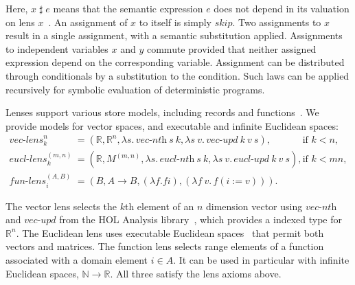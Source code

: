 \documentclass[envcountsame,envcountsect]{llncs}
\newcommand{\sskip}{\mathit{skip}}
\newcommand{\Pow}{\mathcal{P}}
\newcommand{\reals}{\mathbb{R}}
\newcommand{\unrest}{\mathop{\sharp}}
\begin{document}
Here, $x \unrest e$ means that the semantic expression $e$
does not depend in its valuation on lens
$x$~\cite{FosterZW16}. An assignment of $x$ to itself is
simply $\sskip$. Two assignments to $x$ result in a single
assignment, with a semantic substitution
applied. Assignments to independent variables $x$ and $y$
commute provided that neither assigned expression depend on
the corresponding variable.  Assignment can be distributed
through conditionals by a substitution to the
condition. Such laws can be applied recursively for symbolic
evaluation of deterministic programs.


Lenses support various store models, including records and
functions~\cite{FosterZW16}. We provide models for
vector spaces, and executable and infinite Euclidean spaces:
%
\begin{align*}
  \textit{vec-lens}^n_k &=  (\reals, \reals^n, \lambda s.\, \textit{vec-nth}~s~k, \lambda s~v.\, \textit{vec-upd}~k~v~s), & \text{if~} k < n, \\
  \textit{eucl-lens}^{(m,n)}_k & = (\reals, M^{(m,n)}, \lambda s.\, \textit{eucl-nth}~s~k, \lambda s~v.\, \textit{eucl-upd}~k~v~s), & \text{if~} k < mn, \\
  \textit{fun-lens}^{(A,B)}_i &= (B, A \to B, (\lambda f. f i), (\lambda f~v. \, f(i := v))).
\end{align*}

\noindent The vector lens selects the $k$th element of an $n$
dimension vector using $\textit{vec-nth}$ and $\textit{vec-upd}$ from
the HOL Analysis library~\cite{HolzlIH13}, which provides a indexed
type for $\reals^n$. The Euclidean lens uses executable Euclidean
spaces~\cite{ImmlerT19} that permit both vectors and matrices. The
function lens selects range elements of a function associated with a
domain element $i \in A$. It can be used in particular with infinite
Euclidean spaces, $\mathbb{N} \to \reals$. All three satisfy the lens
axioms above.
\end{document}
